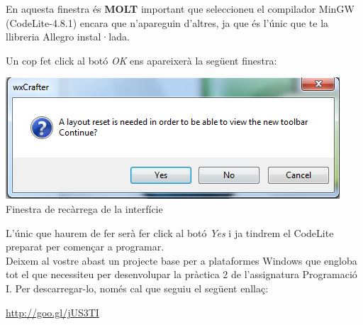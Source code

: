 \documentclass[11pt]{article}
\begin{document}
\noindent En aquesta finestra és \textbf{MOLT} important que seleccioneu el compilador MinGW (CodeLite-4.8.1) encara que n'apareguin d'altres, ja que és l'únic que te la llibreria Allegro instal·lada.

\newpage
Un cop fet click al botó \textit{OK} ens apareixerà la següent finestra:

\begin{center}
	\includegraphics[scale=0.6]{img/Reload.png}\\
	 \small{Finestra de recàrrega de la interfície}
\end{center}

\noindent L'únic que haurem de fer serà fer click al botó \textit{Yes} i ja tindrem el CodeLite preparat per començar a programar.\\

\noindent Deixem al vostre abast un projecte base per a plataformes Windows que engloba tot el que necessiteu per desenvolupar la pràctica 2 de l'assignatura Programació I. Per descarregar-lo, només cal que seguiu el següent enllaç:
\begin{center}
	\url{http://goo.gl/jUS3TI}
\end{center}
\end{document}
